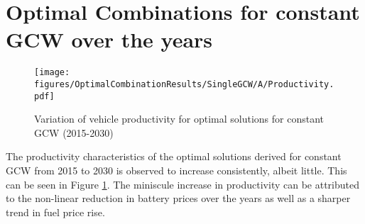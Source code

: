 \documentclass[ExampleMasters.tex]{subfiles}
\begin{document}
	\newpage

\section{Optimal Combinations for constant GCW over the years}

	\begin{figure}[ht!]
		\centering
		\texttt{[image: figures/OptimalCombinationResults/SingleGCW/A/Productivity.pdf]}
		\caption{Variation of vehicle productivity for optimal solutions for constant GCW (2015-2030)}
		\label{prodConstGCWOverYears}
	\end{figure}

	The productivity characteristics of the optimal solutions derived for constant GCW from 2015 to 2030 is observed to increase consistently, albeit little. This can be seen in Figure \ref{prodConstGCWOverYears}. The miniscule increase in productivity can be attributed to the non-linear reduction in battery prices over the years as well as a sharper trend in fuel price rise.\\



\end{document}
